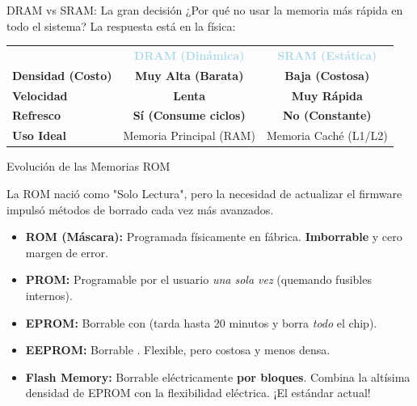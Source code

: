 \documentclass[table, aspectratio=169]{beamer}
\newcommand{\verde}[1]{\textcolor{HitGreen}{\textbf{#1}}}
\newcommand{\rojo}[1]{\textcolor{MissRed}{\textbf{#1}}}
\newcommand{\highlight}[1]{\textcolor{GoldTitle}{\textbf{#1}}}
\begin{document}
\begin{frame}[label={sec:org53adbde}]{DRAM vs SRAM: La gran decisión}
¿Por qué no usar la memoria más rápida en todo el sistema? La respuesta está en la física:

\vspace{4mm}
\begin{table}
\centering\large
\setlength{\tabcolsep}{18pt}
\renewcommand{\arraystretch}{1.5}
\begin{tabular}{@{}lcc@{}}
  \rowcolor{TableHeadBg}
   & \textcolor{LightBlue}{\textbf{DRAM (Dinámica)}} & \textcolor{LightBlue}{\textbf{SRAM (Estática)}} \\
  \rowcolor{TableBodyBg}
  \textbf{Densidad (Costo)} & \verde{Muy Alta (Barata)} & \rojo{Baja (Costosa)} \\
  \rowcolor{TableBodyBg}
  \textbf{Velocidad}        & \rojo{Lenta} & \verde{Muy Rápida} \\
  \rowcolor{TableBodyBg}
  \textbf{Refresco}         & \rojo{Sí (Consume ciclos)} & \verde{No (Constante)} \\
  \rowcolor{TableBodyBg}
  \textbf{Uso Ideal}        & Memoria Principal (RAM) & Memoria Caché (L1/L2) \\
\end{tabular}
\end{table}
\end{frame}

\begin{frame}[label={sec:org29fd52c}]{Evolución de las Memorias ROM}
\begin{conceptobox}
  La ROM nació como "Solo Lectura", pero la necesidad de actualizar el firmware impulsó métodos de borrado cada vez más avanzados.
\end{conceptobox}
\vspace{2mm}

\begin{itemize}[<+->]
  \item \highlight{ROM (Máscara):} Programada físicamente en fábrica. \rojo{Imborrable} y cero margen de error.
  \item \highlight{PROM:} Programable por el usuario \textit{una sola vez} (quemando fusibles internos).
  \item \highlight{EPROM:} Borrable con  (tarda hasta 20 minutos y borra \textit{todo} el chip).
  \item \highlight{EEPROM:} Borrable . Flexible, pero costosa y menos densa.
  \item \highlight{Flash Memory:} Borrable eléctricamente \verde{por bloques}. Combina la altísima densidad de EPROM con la flexibilidad eléctrica. ¡El estándar actual!
\end{itemize}
\end{frame}
\end{document}
